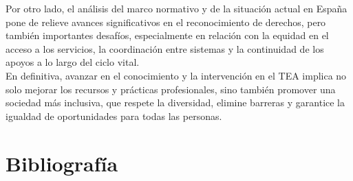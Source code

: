 \documentclass{article}
\begin{document}
Por otro lado, el análisis del marco normativo y de la situación actual en España pone de relieve avances significativos en el reconocimiento de derechos, pero también importantes desafíos, especialmente en relación con la equidad en el acceso a los servicios, la coordinación entre sistemas y la continuidad de los apoyos a lo largo del ciclo vital.\\

En definitiva, avanzar en el conocimiento y la intervención en el TEA implica no solo mejorar los recursos y prácticas profesionales, sino también promover una sociedad más inclusiva, que respete la diversidad, elimine barreras y garantice la igualdad de oportunidades para todas las personas.\\



\newpage
\section{\textbf{Bibliografía}}
\end{document}
